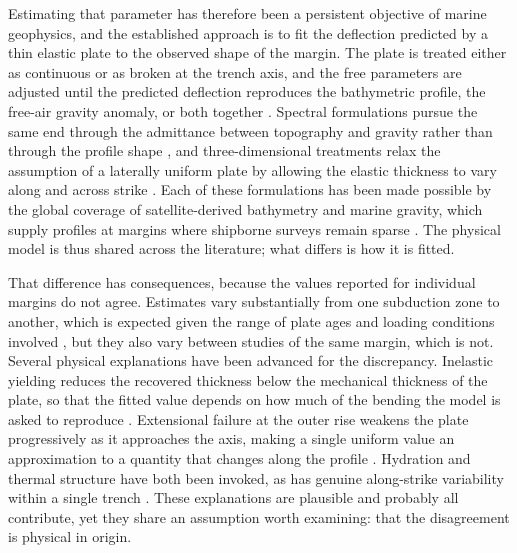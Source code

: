 \documentclass[final]{agujournal2019}
\begin{document}
Estimating that parameter has therefore been a persistent objective of marine
geophysics, and the established approach is to fit the deflection predicted by a
thin elastic plate to the observed shape of the margin. The plate is treated
either as continuous or as broken at the trench axis, and the free parameters
are adjusted until the predicted deflection reproduces the bathymetric profile,
the free-air gravity anomaly, or both together
\cite{Tandon2000,ContrerasReyesOsses2010}. Spectral formulations pursue the same
end through the admittance between topography and gravity rather than through
the profile shape \cite{CalmantCazenave1987,Manea2005}, and three-dimensional
treatments relax the assumption of a laterally uniform plate by allowing the
elastic thickness to vary along and across strike \cite{Manriquez2014}. Each of
these formulations has been made possible by the global coverage of
satellite-derived bathymetry and marine gravity, which supply profiles at
margins where shipborne surveys remain sparse
\cite{Sandwell2014,CalmantBaudry1996,BaudryCalmant1996}. The physical model is
thus shared across the literature; what differs is how it is fitted.

That difference has consequences, because the values reported for individual
margins do not agree. Estimates vary substantially from one subduction zone to
another, which is expected given the range of plate ages and loading conditions
involved \cite{DiGiuseppe2009,SchettinoTassi2011}, but they also vary between
studies of the same margin, which is not. Several physical explanations have
been advanced for the discrepancy. Inelastic yielding reduces the recovered
thickness below the mechanical thickness of the plate, so that the fitted value
depends on how much of the bending the model is asked to reproduce
\cite{ContrerasReyesOsses2010,Tandon2000}. Extensional failure at the outer rise
weakens the plate progressively as it approaches the axis, making a single
uniform value an approximation to a quantity that changes along the profile
\cite{Craig2014,KaoChen1996}. Hydration and thermal structure have both been
invoked, as has genuine along-strike variability within a single trench
\cite{ContrerasReyes2007,MoscosoContrerasReyes2012}. These explanations are
plausible and probably all contribute, yet they share an assumption worth
examining: that the disagreement is physical in origin.
\end{document}

